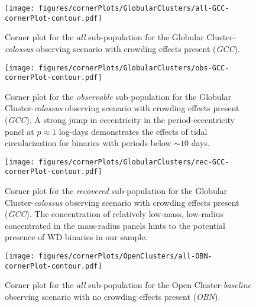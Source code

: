 \documentclass[twocolumn]{aastex63}
\begin{document}
\begin{figure}
    \centering
    \texttt{[image: figures/cornerPlots/GlobularClusters/all-GCC-cornerPlot-contour.pdf]}
    \caption{Corner plot for the \textit{all} sub-population for the Globular Cluster-\textit{colossus} observing scenario with crowding effects present (\textit{GCC}).}
    \label{fig:gcc-all-corner-plot-appendix}
\end{figure}\clearpage

\begin{figure}
    \centering
    \texttt{[image: figures/cornerPlots/GlobularClusters/obs-GCC-cornerPlot-contour.pdf]}
    \caption{Corner plot for the \textit{observable} sub-population for the Globular Cluster-\textit{colossus} observing scenario with crowding effects present (\textit{GCC}). A strong jump in eccentricity in the period-eccentricity panel at $p \approx 1$ log-days demonstrates the effects of tidal circularization for binaries with periods below $\sim 10$ days.}
    \label{fig:gcn-obs-corner-plot-appendix}
\end{figure}\clearpage

\begin{figure}
    \centering
    \texttt{[image: figures/cornerPlots/GlobularClusters/rec-GCC-cornerPlot-contour.pdf]}
    \caption{Corner plot for the \textit{recovered} sub-population for the Globular Cluster-\textit{colossus} observing scenario with crowding effects present (\textit{GCC}). The concentration of relatively low-mass, low-radius concentrated in the mass-radius panels hints to the potential presence of WD binaries in our sample.}
    \label{fig:gcc-rec-corner-plot-appendix}
\end{figure}\clearpage

\begin{figure}
    \centering
    \texttt{[image: figures/cornerPlots/OpenClusters/all-OBN-cornerPlot-contour.pdf]}
    \caption{Corner plot for the \textit{all} sub-population for the Open Cluster-\textit{baseline} observing scenario with no crowding effects present (\textit{OBN}).}
    \label{fig:obn-all-corner-plot-appendix}
\end{figure}\clearpage
\end{document}
